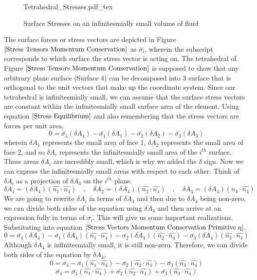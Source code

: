 \begin{figure}[H]\centering
\def\svgwidth{400px}
{Tetrahedral_Stresses.pdf_tex}
\caption{Surface Stresses on an infinitesmially small volume of fluid}
\label{Stress Tensors Momentum Conservation}
\end{figure}
The surface forces or stress vectors are depicted in Figure $\ref{Stress Tensors Momentum Conservation}$ as $\bar{\sigma}_{i}$, wherein the subscript corresponds to which surface the stress vector is acting on.
The tetrahedral of Figure $\ref{Stress Tensors Momentum Conservation}$ is supposed to show that any arbitrary plane surface (Surface 4) can be decomposed into $3$ surface that is orthogonal to the unit vectors that make up the coordinate system.
Since our tetrahedral is infinitesmially small, we can assume that the surface stress vectors are constant within the infinitesmially small surface area of the element.
Using equation $\ref{Stress Equilibrium}$ and also remembering that the stress vectors are forces per unit area,
\begin{equation}0 = \bar{\sigma_{4}}(\delta A_{4}) - \bar{\sigma_{1}}(\delta A_{1}) - \bar{\sigma_{2}}(\delta A_{2}) - \bar{\sigma_{3}}(\delta A_{3}) \label{Stress Vectors Momentum Conservation Primitive q}\end{equation}
wherein $\delta A_{1}$ represents the small area of face 1,  $\delta A_{2}$ represents the small area of face 2, and so $\delta A_{i}$ represents the infinitesmially small area of the $i^{th}$ surface.
These areas $\delta A_{i}$ are incredibly small, which is why we added the $\delta$ sign.
Now we can express the infinitesmially small areas with respect to each other. 
Think of $\delta A_{i}$ as a projection of $\delta A_{4}$ on the $i^{th}$ plane.
$$\delta A_{1} = (\delta A_{4})(\hat{n_{1}}\cdot \hat{n_{4}}) \quad,\quad \delta A_{2} = (\delta A_{4})(\hat{n_{2}}\cdot \hat{n_{4}}) \quad,\quad \delta A_{3} = (\delta A_{4})(\hat{n_{3}}\cdot \hat{n_{4}})$$
We are going to rewrite $\delta A_{i}$ in terms of $\delta A_{4}$ and then due to $\delta A_{4}$ being non-zero, we can divide both sides of the equation using $\delta A_{4}$ and then arrive at an expression fully in terms of $\sigma_{i}$.
This will give us some important realizations.
Substituting into equation $\ref{Stress Vectors Momentum Conservation Primitive q}$,
$$0 = \bar{\sigma_{4}}(\delta A_{4}) 
- \bar{\sigma_{1}}(\delta A_{4})(\hat{n_{1}}\cdot \hat{n_{4}})
- \bar{\sigma_{2}}(\delta A_{4})(\hat{n_{2}}\cdot \hat{n_{4}})
- \bar{\sigma_{3}}(\delta A_{4})(\hat{n_{3}}\cdot \hat{n_{4}})$$
Although $\delta A_{4}$ is infinitesmially small, it is still non-zero. 
Therefore, we can divide both sides of the equation by $\delta A_{4}$,
$$0 = \bar{\sigma_{4}} - \bar{\sigma_{1}}(\hat{n_{1}}\cdot \hat{n_{4}}) - \bar{\sigma_{2}}(\hat{n_{2}}\cdot \hat{n_{4}}) - \bar{\sigma_{3}}(\hat{n_{3}}\cdot \hat{n_{4}})$$
$$\bar{\sigma_{4}} = \bar{\sigma_{1}}(\hat{n_{1}}\cdot \hat{n_{4}}) + \bar{\sigma_{2}}(\hat{n_{2}}\cdot \hat{n_{4}}) + \bar{\sigma_{3}}(\hat{n_{3}}\cdot \hat{n_{4}})$$


